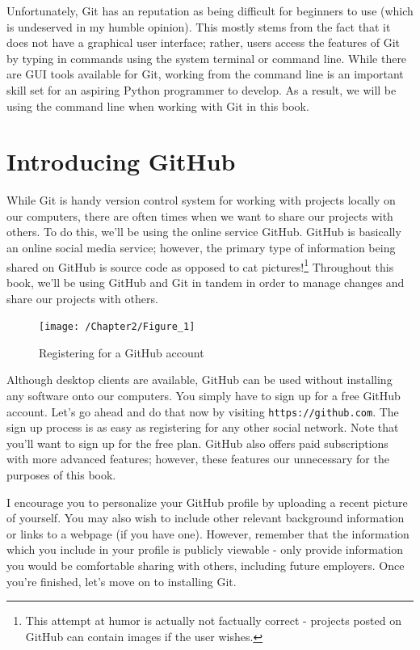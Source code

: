 \documentclass{book}
\begin{document}
Unfortunately, Git has an reputation as being difficult for beginners to use (which is undeserved in my humble opinion). This mostly stems from the fact that it does not have a graphical user interface; rather, users access the features of Git by typing in commands using the system terminal or command line. While there are GUI tools available for Git, working from the command line is an important skill set for an aspiring Python programmer to develop. As a result, we will be using the command line when working with Git in this book. 

\section{Introducing GitHub}

While Git is handy version control system for working with projects locally on our computers, there are often times when we want to share our projects with others. To do this, we'll be using the online service GitHub\texttrademark. GitHub is basically an online social media service; however, the primary type of information being shared on GitHub is source code as opposed to cat pictures!\footnote{This attempt at humor is actually not factually correct - projects posted on GitHub can contain images if the user wishes.} Throughout this book, we'll be using GitHub and Git in tandem in order to manage changes and share our projects with others.

\begin{figure}[h]
	\caption{Registering for a GitHub account}
	\centering\texttt{[image: /Chapter2/Figure\_1]}
\end{figure}

Although desktop clients are available, GitHub can be used without installing any software onto our computers. You simply have to sign up for a free GitHub account. Let's go ahead and do that now by visiting \texttt{https://github.com}. The sign up process is as easy as registering for any other social network. Note that you'll want to sign up for the free plan. GitHub also offers paid subscriptions with more advanced features; however, these features our unnecessary for the purposes of this book.

I encourage you to personalize your GitHub profile by uploading a recent picture of yourself. You may also wish to include  other relevant background information  or links to a webpage (if you have one). However, remember that the information which you include in your profile is publicly viewable - only provide information you would be comfortable sharing with others, including future employers. Once you're finished, let's move on to installing Git.
\end{document}
